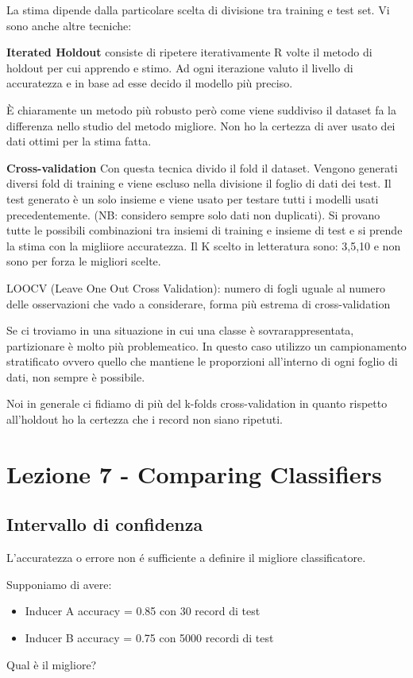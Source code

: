 La stima dipende dalla particolare scelta di divisione tra training e test set. Vi sono anche altre tecniche:

\textbf{Iterated Holdout} consiste di ripetere iterativamente R volte il metodo di holdout per cui apprendo e stimo. Ad ogni iterazione valuto il livello di accuratezza e in base ad esse decido il modello pi\`u preciso.

\`E chiaramente un metodo pi\`u robusto per\`o come viene suddiviso il dataset fa la differenza nello studio del metodo migliore. Non ho la certezza di aver usato dei dati ottimi per la stima fatta. 

\textbf{Cross-validation} 
Con questa tecnica divido il fold il dataset. Vengono generati diversi fold di training e viene escluso nella divisione il foglio di dati dei test. Il test generato \`e un solo insieme e viene usato per testare tutti i modelli usati precedentemente. (NB: considero sempre solo dati non duplicati). Si provano tutte le possibili combinazioni tra insiemi di training e insieme di test e si prende la stima con la migliiore accuratezza. 
Il K scelto in letteratura sono: 3,5,10 e non sono per forza le migliori scelte.

LOOCV (Leave One Out Cross Validation): numero di fogli uguale al numero delle osservazioni che vado a considerare, forma pi\`u estrema di cross-validation

Se ci troviamo in una situazione in cui una classe \`e sovrarappresentata, partizionare \`e molto pi\`u problemeatico. In questo caso utilizzo un campionamento stratificato ovvero quello che mantiene le proporzioni all'interno di ogni foglio di dati, non sempre \`e possibile. 


Noi in generale ci fidiamo di pi\`u del k-folds cross-validation in quanto rispetto all'holdout ho la certezza che i record non siano ripetuti.

\section{Lezione 7 - Comparing Classifiers}
\subsection{Intervallo di confidenza}
L'accuratezza o errore non \'e sufficiente a definire il migliore classificatore.

Supponiamo di avere:
\begin{itemize}
	\item Inducer A accuracy = 0.85 con 30 record di test
	\item Inducer B accuracy = 0.75 con 5000 recordi di test
\end{itemize}
Qual \`e il migliore?

